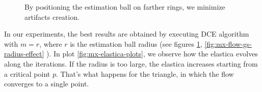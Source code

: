\documentclass[runningheads]{llncs}
\begin{document}
\begin{figure}[!ht]
\begin{minipage}[b]{0.33\textwidth}
{	}%
\end{minipage}%
\begin{minipage}[b]{0.33\textwidth}
\end{minipage}%
\label{fig:mx-square-flow}
\caption{By positioning the estimation ball on farther rings, we minimize artifacts creation. }
\end{figure}

In our experiments, the best results are obtained by executing DCE algorithm with $m=r$, where $r$ is the estimation ball radius (see figures \ref{fig:mx-square-flow}, \ref{fig:mx-flow-gs-radius-effect} ). In plot \ref{fig:mx-elastica-plots}, we observe how the elastica evolves along the iterations. If the radius is too large, the elastica increases starting from a critical point $p$. That's what happens for the triangle, in which the flow converges to a single point. 
\end{document}
